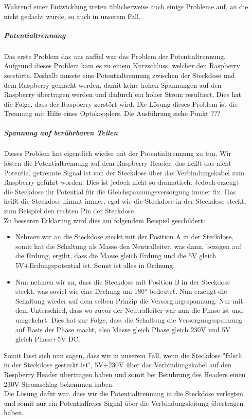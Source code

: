 Während einer Entwicklung treten üblicherweise auch einige Probleme auf, an die nicht gedacht wurde, so auch in unserem Fall.\\
\subparagraph{Potentialtrennung}
Das erste Problem das uns auffiel war das Problem der Potentialtrennung. Aufgrund dieses Problem kam es zu einem Kurzschluss, welcher den Raspberry zerstörte. Deshalb musste eine Potentialtrennung zwischen der Steckdose und dem Raspberry gemacht werden, damit keine hohen Spannungen auf den Raspberry übertragen werden und dadurch ein hoher Strom resultiert. Dies hat die Folge, dass der Raspberry zerstört wird. Die Lösung dieses Problem ist die Trennung mit Hilfe eines Optokopplers. Die Ausführung siehe Punkt ??? \\
\subparagraph{Spannung auf berührbaren Teilen}
Dieses Problem hat eigentlich wieder mit der Potentialtrennung zu tun. Wir lösten die Potentialtrennung auf dem Raspberry Header, das heißt das nicht Potential getrennte Signal ist von der Steckdose über das Verbindungskabel zum Raspberry geführt worden. Dies ist jedoch nicht so dramatisch. Jedoch erzeugt die Steckdose ihr Potential für die Gleichspannungsversorgung immer fix. Das heißt die Steckdose nimmt immer, egal wie die Steckdose in der Steckdose steckt, zum Beispiel den rechten Pin der Steckdose.\\
Zu besseren Erklärung wird dies am folgendem Beispiel geschildert:\\
\begin{itemize}
	\item Nehmen wir an die Steckdose steckt mit der Position A in der Steckdose, somit hat die Schaltung als Masse den Neutralleiter, was dann, bezogen auf die Erdung, ergibt, dass die Masse gleich Erdung und die  5V gleich 5V+Erdungspotential ist. Somit ist alles in Ordnung.
	\item Nun nehmen wir an, dass die Steckdose mit Position B in der Steckdose steckt, was soviel wie eine Drehung um 180° bedeutet. Nun erzeugt die Schaltung wieder auf dem selben Prinzip die Versorgungsspannung. Nur mit dem Unterschied, dass wo zuvor der Neutralleiter war nun die Phase ist und umgekehrt. Dies hat zur Folge, dass die Schaltung die Versorgungsspannung auf Basis der Phase macht, also Masse gleich Phase gleich 230V und 5V gleich Phase+5V DC.
\end{itemize}
Somit lässt sich nun sagen, dass wir in unserem Fall, wenn die Steckdose "falsch in der Steckdose gesteckt ist", 5V+230V über das Verbindungskabel auf den Respberry Header übertragen haben und somit bei Berührung des Headers einen 230V Stromschlag bekommen haben.\\
Die Lösung dafür war, dass wir die Potentialtrennung in die Steckdose verlegten und somit nur ein Potentialfreies Signal über die Verbindungsleitung übertragen haben.